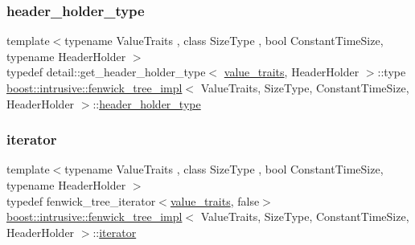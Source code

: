 \subsubsection{\texorpdfstring{header\+\_\+holder\+\_\+type}{header\_holder\_type}}
{\footnotesize\ttfamily template$<$typename Value\+Traits , class Size\+Type , bool Constant\+Time\+Size, typename Header\+Holder $>$ \\
typedef detail\+::get\+\_\+header\+\_\+holder\+\_\+type$<$ \hyperlink{classboost_1_1intrusive_1_1fenwick__tree__impl_a2e87a9b3164c911991b62a4405bdca5f}{value\+\_\+traits}, Header\+Holder $>$\+::type \hyperlink{classboost_1_1intrusive_1_1fenwick__tree__impl}{boost\+::intrusive\+::fenwick\+\_\+tree\+\_\+impl}$<$ Value\+Traits, Size\+Type, Constant\+Time\+Size, Header\+Holder $>$\+::\hyperlink{classboost_1_1intrusive_1_1fenwick__tree__impl_ae20783e43141c54fd66b9b0c582ed94a}{header\+\_\+holder\+\_\+type}}

\mbox{\label{classboost_1_1intrusive_1_1fenwick__tree__impl_a6293502e34de9b16ae198ec557c82132}} 
\subsubsection{\texorpdfstring{iterator}{iterator}}
{\footnotesize\ttfamily template$<$typename Value\+Traits , class Size\+Type , bool Constant\+Time\+Size, typename Header\+Holder $>$ \\
typedef fenwick\+\_\+tree\+\_\+iterator$<$\hyperlink{classboost_1_1intrusive_1_1fenwick__tree__impl_a2e87a9b3164c911991b62a4405bdca5f}{value\+\_\+traits}, false$>$ \hyperlink{classboost_1_1intrusive_1_1fenwick__tree__impl}{boost\+::intrusive\+::fenwick\+\_\+tree\+\_\+impl}$<$ Value\+Traits, Size\+Type, Constant\+Time\+Size, Header\+Holder $>$\+::\hyperlink{classboost_1_1intrusive_1_1fenwick__tree__impl_a6293502e34de9b16ae198ec557c82132}{iterator}}

\mbox{\label{classboost_1_1intrusive_1_1fenwick__tree__impl_a6546b8d5a2d043e99e5e28853a8da248}} 
